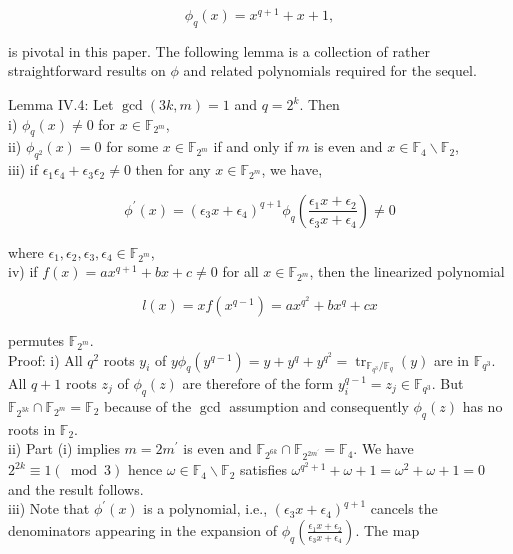 \documentclass[10pt]{article}
\begin{document}
$$
\phi_{q}(x)=x^{q+1}+x+1,
$$

is pivotal in this paper. The following lemma is a collection of rather straightforward results on $\phi$ and related polynomials required for the sequel.

Lemma IV.4: Let $\operatorname{gcd}(3 k, m)=1$ and $q=2^{k}$. Then\\
i) $\phi_{q}(x) \neq 0$ for $x \in \mathbb{F}_{2^{m}}$,\\
ii) $\phi_{q^{2}}(x)=0$ for some $x \in \mathbb{F}_{2^{m}}$ if and only if $m$ is even and $x \in \mathbb{F}_{4} \backslash \mathbb{F}_{2}$,\\
iii) if $\epsilon_{1} \epsilon_{4}+\epsilon_{3} \epsilon_{2} \neq 0$ then for any $x \in \mathbb{F}_{2^{m}}$, we have,

$$
\phi^{\prime}(x)=\left(\epsilon_{3} x+\epsilon_{4}\right)^{q+1} \phi_{q}\left(\frac{\epsilon_{1} x+\epsilon_{2}}{\epsilon_{3} x+\epsilon_{4}}\right) \neq 0
$$

where $\epsilon_{1}, \epsilon_{2}, \epsilon_{3}, \epsilon_{4} \in \mathbb{F}_{2^{m}}$,\\
iv) if $f(x)=a x^{q+1}+b x+c \neq 0$ for all $x \in \mathbb{F}_{2^{m}}$, then the linearized polynomial

$$
l(x)=x f\left(x^{q-1}\right)=a x^{q^{2}}+b x^{q}+c x
$$

permutes $\mathbb{F}_{2^{m}}$.\\
Proof: i) All $q^{2}$ roots $y_{i}$ of $y \phi_{q}\left(y^{q-1}\right)=y+y^{q}+ y^{q^{2}}=\operatorname{tr}_{\mathbb{F}_{q^{3}} / \mathbb{F}_{q}}(y)$ are in $\mathbb{F}_{q^{3}}$. All $q+1$ roots $z_{j}$ of $\phi_{q}(z)$ are therefore of the form $y_{i}^{q-1}=z_{j} \in \mathbb{F}_{q^{3}}$. But $\mathbb{F}_{2^{3 k}} \cap \mathbb{F}_{2^{m}}=\mathbb{F}_{2}$ because of the $\operatorname{gcd}$ assumption and consequently $\phi_{q}(z)$ has no roots in $\mathbb{F}_{2}$.\\
ii) Part (i) implies $m=2 m^{\prime}$ is even and $\mathbb{F}_{2^{6 k}} \cap \mathbb{F}_{2^{2 m^{\prime}}}=\mathbb{F}_{4}$. We have $2^{2 k} \equiv 1(\bmod 3)$ hence $\omega \in \mathbb{F}_{4} \backslash \mathbb{F}_{2}$ satisfies $\omega^{q^{2}+1}+\omega+1=\omega^{2}+\omega+1=0$ and the result follows.\\
iii) Note that $\phi^{\prime}(x)$ is a polynomial, i.e., $\left(\epsilon_{3} x+\epsilon_{4}\right)^{q+1}$ cancels the denominators appearing in the expansion of $\phi_{q}\left(\frac{\epsilon_{1} x+\epsilon_{2}}{\epsilon_{3} x+\epsilon_{4}}\right)$. The map
\end{document}
